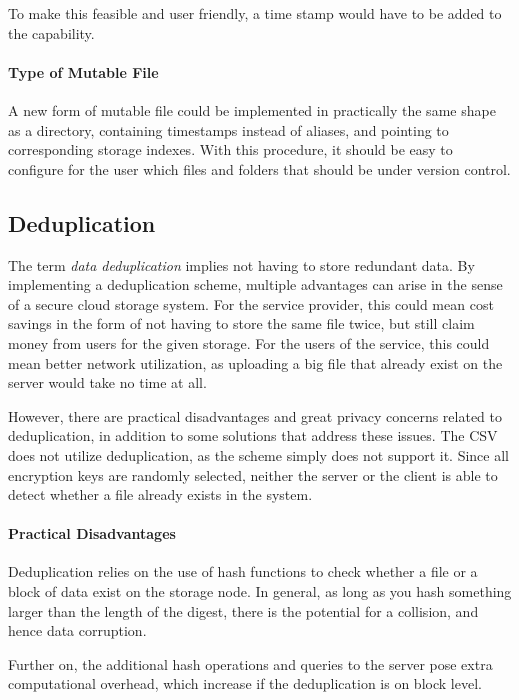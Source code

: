 \documentclass[pdftex,english,10pt,b5paper,twoside]{book}
\begin{document}
To make this feasible and user friendly, a time stamp would have to be added to
the capability.

\paragraph{Type of Mutable File} A new form of mutable file could be
implemented in practically the same shape as a directory, containing timestamps
instead of aliases, and pointing to corresponding storage indexes. With this
procedure, it should be easy to configure for the user which files and folders
that should be under version control.

\subsection{Deduplication}

The term \emph{data deduplication} implies not having to store redundant data.
By implementing a deduplication scheme, multiple advantages can arise in the
sense of a secure cloud storage system. For the service provider, this could
mean cost savings in the form of not having to store the same file twice, but
still claim money from users for the given storage. For the users of the
service, this could mean better network utilization, as uploading a big file
that already exist on the server would take no time at all.

However, there are practical disadvantages and great privacy concerns related
to deduplication, in addition to some solutions that address these issues.
The \ac{CSV} does not utilize deduplication, as the scheme simply does not
support it. Since all encryption keys are randomly selected, neither the server
or the client is able to detect whether a file already exists in the system.

\paragraph{Practical Disadvantages} Deduplication relies on the use of hash
functions to check whether a file or a block of data exist on the storage node.
In general, as long as you hash something larger than the length of the digest,
there is the potential for a collision, and hence data corruption.

Further on, the additional hash operations and queries to the server pose
extra computational overhead, which increase if the deduplication is on block
level.
\end{document}
